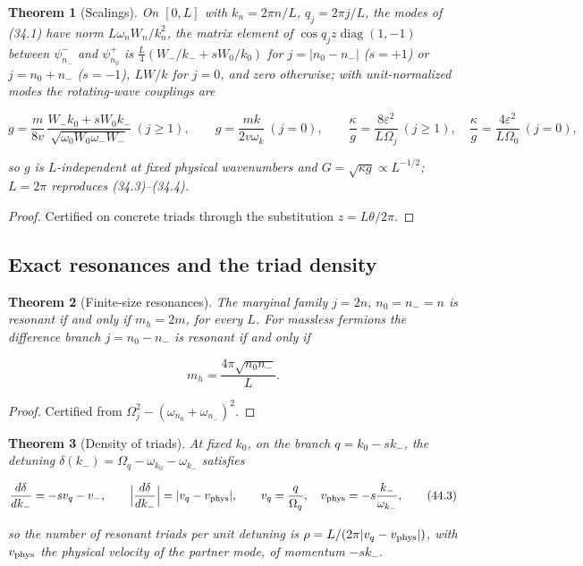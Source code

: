 \documentclass[11pt]{article}
\newtheorem{theorem}{Theorem}[section]
\theoremstyle{remark}
\begin{document}
\begin{theorem}[Scalings]
\label{thm:v20v41-scalings}
On \([0,L]\) with \(k_n=2\pi n/L\), \(q_j=2\pi j/L\), the modes of (34.1)
have norm \(L\omega_nW_n/k_n^2\), the matrix element of
\(\cos q_jz\operatorname{diag}(1,-1)\) between \(\psi_{n_-}^-\) and
\(\psi_{n_0}^+\) is \(\tfrac L4(W_-/k_-+sW_0/k_0)\) for \(j=|n_0-n_-|\)
(\(s=+1\)) or \(j=n_0+n_-\) (\(s=-1\)), \(LW/k\) for \(j=0\), and zero
otherwise; with unit-normalized modes the rotating-wave couplings
are

\[
 g=\frac m{8v}\,\frac{W_-k_0+sW_0k_-}{\sqrt{\omega_0W_0\omega_-W_-}}\ (j\ge1),\qquad
 g=\frac{mk}{2v\omega_k}\ (j=0),\qquad
 \frac\kappa g=\frac{8\varepsilon^2}{L\Omega_j}\ (j\ge1),\quad \frac\kappa g=\frac{4\varepsilon^2}{L\Omega_0}\ (j=0),
                                                                    \tag{44.1}
\]

so \(g\) is \(L\)-independent at fixed physical wavenumbers and
\(G=\sqrt{\kappa g}\propto L^{-1/2}\); \(L=2\pi\) reproduces
(34.3)--(34.4).
\end{theorem}

\begin{proof}
Certified on concrete triads through the substitution
\(z=L\theta/2\pi\).
\end{proof}

\subsection{Exact resonances and the triad density}

\begin{theorem}[Finite-size resonances]
\label{thm:v20v41-resonances}
The marginal family \(j=2n\), \(n_0=n_-=n\) is resonant if and only if
\(m_h=2m\), for every \(L\).  For massless fermions the difference
branch \(j=n_0-n_-\) is resonant if and only if

\[
 m_h=\frac{4\pi\sqrt{n_0n_-}}L.                                       \tag{44.2}
\]
\end{theorem}

\begin{proof}
Certified from \(\Omega_j^2-(\omega_{n_0}+\omega_{n_-})^2\).
\end{proof}

\begin{theorem}[Density of triads]
\label{thm:v20v41-density}
At fixed \(k_0\), on the branch \(q=k_0-sk_-\), the detuning
\(\delta(k_-)=\Omega_q-\omega_{k_0}-\omega_{k_-}\) satisfies

\[
 \frac{d\delta}{dk_-}=-sv_q-v_-,\qquad
 \Bigl|\frac{d\delta}{dk_-}\Bigr|=|v_q-v_{\rm phys}|,\qquad
 v_q=\frac q{\Omega_q},\quad v_{\rm phys}=-s\frac{k_-}{\omega_{k_-}},        \tag{44.3}
\]

so the number of resonant triads per unit detuning is
\(\rho=L/(2\pi|v_q-v_{\rm phys}|)\), with \(v_{\rm phys}\) the physical
velocity of the partner mode, of momentum \(-sk_-\).
\end{theorem}
\end{document}
